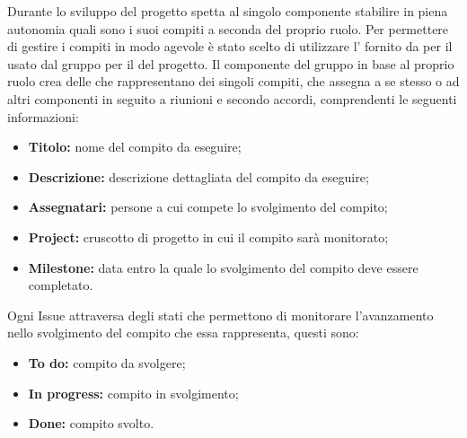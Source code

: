\label{GestioneCompiti}
Durante lo sviluppo del progetto spetta al singolo componente stabilire in piena autonomia quali sono i suoi compiti a seconda del proprio ruolo.
Per permettere di gestire i compiti in modo agevole è stato scelto di utilizzare l' fornito da  per il  usato dal gruppo per il  del progetto.
Il componente del gruppo in base al proprio ruolo crea delle  che rappresentano dei singoli compiti, che assegna a se stesso o ad altri componenti in seguito a riunioni e secondo accordi, comprendenti le seguenti informazioni:
\begin{itemize}
	\item \textbf{Titolo:} nome del compito da eseguire;
	\item \textbf{Descrizione:} descrizione dettagliata del compito da eseguire;
	\item \textbf{Assegnatari:} persone a cui compete lo svolgimento del compito;
	\item \textbf{Project:} cruscotto di progetto in cui il compito sarà monitorato;
	\item \textbf{Milestone:} data entro la quale lo svolgimento del compito deve essere completato.
\end{itemize}
Ogni Issue attraversa degli stati che permettono di monitorare l'avanzamento nello svolgimento del compito che essa rappresenta, questi sono:
\begin{itemize}
	\item \textbf{To do:} compito da svolgere;
	\item \textbf{In progress:} compito in svolgimento;
	\item \textbf{Done:} compito svolto.
\end{itemize}

